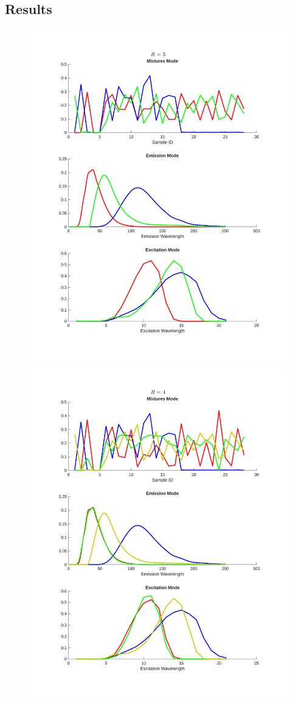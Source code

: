 \subsection*{Results}

\begin{figure}[H]
    \centering
    \includegraphics[trim = 2cm 5cm 2cm 5cm, clip, width=0.46\linewidth]{figures/factors_rank3.pdf}
    \includegraphics[trim = 2cm 5cm 2cm 5cm, clip, width=0.46\linewidth]{figures/factors_rank4.pdf}
    \caption{}
    \label{fig:plot_factors}
\end{figure}

